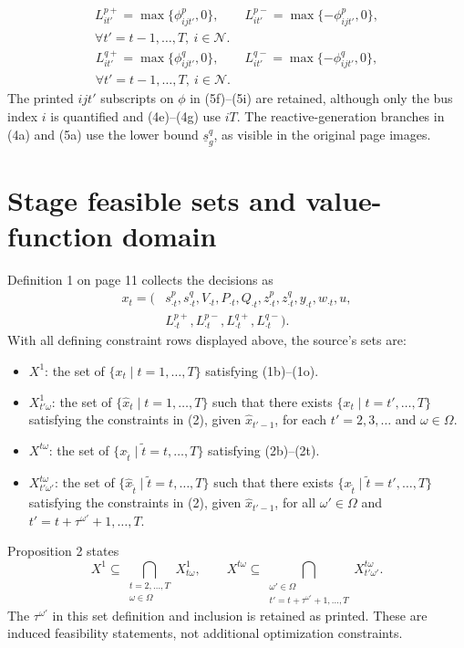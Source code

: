 \documentclass[10pt]{article}
\begin{document}
\begin{equation}
\begin{gathered}
L_{it'}^{p+}=\max\{\phi_{ijt'}^p,0\},\qquad L_{it'}^{p-}=\max\{-\phi_{ijt'}^p,0\},\\
\forall t'=t-1,\ldots,T,\ i\in\mathcal N.
\end{gathered}\tag{5h}
\end{equation}
\begin{equation}
\begin{gathered}
L_{it'}^{q+}=\max\{\phi_{ijt'}^q,0\},\qquad L_{it'}^{q-}=\max\{-\phi_{ijt'}^q,0\},\\
\forall t'=t-1,\ldots,T,\ i\in\mathcal N.
\end{gathered}\tag{5i}
\end{equation}
The printed $ijt'$ subscripts on $\phi$ in (5f)--(5i) are retained, although only the bus index $i$ is quantified and (4e)--(4g) use $iT$. The reactive-generation branches in (4a) and (5a) use the lower bound $\underline s_g^q$, as visible in the original page images.

\section*{Stage feasible sets and value-function domain}
Definition 1 on page 11 collects the decisions as
\[
\begin{aligned}
x_t=(&s_{\cdot t}^p,s_{\cdot t}^q,V_{\cdot t},P_{\cdot t},Q_{\cdot t},z_{\cdot t}^p,z_{\cdot t}^q,y_{\cdot t},w_{\cdot t},u,\\
&L_{\cdot t}^{p+},L_{\cdot t}^{p-},L_{\cdot t}^{q+},L_{\cdot t}^{q-}).
\end{aligned}
\]
With all defining constraint rows displayed above, the source's sets are:
\begin{itemize}
\item $X^1$: the set of $\{x_t\mid t=1,\ldots,T\}$ satisfying (1b)--(1o).
\item $X^1_{t'\omega}$: the set of $\{\hat x_t\mid t=1,\ldots,T\}$ such that there exists $\{x_t\mid t=t',\ldots,T\}$ satisfying the constraints in (2), given $\hat x_{t'-1}$, for each $t'=2,3,\ldots$ and $\omega\in\Omega$.
\item $X^{t\omega}$: the set of $\{x_{\tilde t}\mid\tilde t=t,\ldots,T\}$ satisfying (2b)--(2t).
\item $X^{t\omega}_{t'\omega'}$: the set of $\{\hat x_{\tilde t}\mid\tilde t=t,\ldots,T\}$ such that there exists $\{x_{\tilde t}\mid\tilde t=t',\ldots,T\}$ satisfying the constraints in (2), given $\hat x_{t'-1}$, for all $\omega'\in\Omega$ and $t'=t+\tau^{\omega'}+1,\ldots,T$.
\end{itemize}
Proposition 2 states
\[
X^1\subseteq\bigcap_{\substack{t=2,\ldots,T\\\omega\in\Omega}}X^1_{t\omega},
\qquad
X^{t\omega}\subseteq\bigcap_{\substack{\omega'\in\Omega\\t'=t+\tau^{\omega'}+1,\ldots,T}}X^{t\omega}_{t'\omega'}.
\]
The $\tau^{\omega'}$ in this set definition and inclusion is retained as printed. These are induced feasibility statements, not additional optimization constraints.
\end{document}
